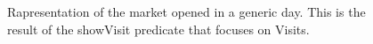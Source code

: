 \begin{figure}[H]
\caption{Rapresentation of the market opened in a generic day. This is the result of the showVisit predicate that focuses on Visits.}
  \label{showVisit}
  \centering
    
\end{figure}


